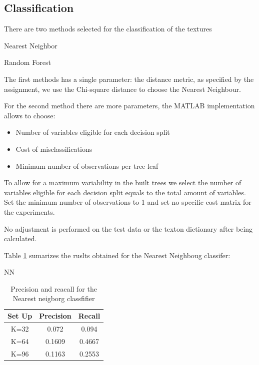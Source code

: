 \documentclass[a4paper]{article}
\begin{document}
\subsection{Classification}
There are two methods selected for the classification of the textures

\begin{description}

\item[Nearest Neighbor] \cite{}
\item[Random Forest] \cite{}

\end{description}

The first methods has a single parameter: the distance metric, as specified by the assignment, we use the Chi-square distance to choose the Nearest Neighbour.

For the second method there are more parameters, the MATLAB implementation allows to choose:

\begin{itemize}
	\item Number of variables eligible for each decision split
	\item Cost of misclassifications
	\item Minimum number of observations per tree leaf
\end{itemize}

To allow for a maximum variability in the built trees we select the number of variables eligible for each decision split equals to the total amount of variables. Set the minimum number of observations to 1 and set no specific cost matrix for the experiments.

No adjustment is performed on the test data or the texton dictionary after being calculated.

Table \ref{table:table1} sumarizes the ruslts obtained for the Nearest Neighboug classifer:

NN
\begin{table}[t]
\centering
\begin{tabular}{c | c | c}
Set Up & Precision & Recall   \\
\hline	
K=32 & 0.072 & 0.094 \\
K=64 & 0.1609 & 0.4667 \\
K=96 &  0.1163&  0.2553 \\

\end{tabular}
\caption{Precision and reacall for the Nearest neigborg classfifier}
\label{table:table1}
\end{table}
\end{document}

